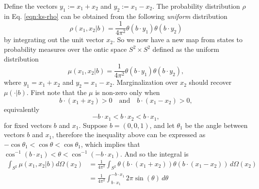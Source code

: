 \documentclass[12pt,draft]{article}
\theoremstyle{definition}
\theoremstyle{plain}
\begin{document}
    Define the vectors $y_1 := x_1 + x_2$ and $y_2 := x_1 -
    x_2$.  The probability distribution $\rho$ in Eq.
    \eqref{eqn:ks-rho} can be obtained from the following
    \textit{uniform} distribution
    \begin{equation}
        \rho(x_1, x_2 | b)
        = \frac{1}{4\pi^2} \theta(b \cdot y_1)
        \theta(b \cdot y_2)
    \end{equation}
    by integrating out the unit vector $x_2$. 
    {
        \color{blue}
        So we now have a new map from states to probability
        measures over the ontic space $S^2 \times S^2$
        defined as the uniform distribution
        \begin{equation}
            \mu(x_1, x_2 | b)
            = \frac{1}{4\pi^2}
            \theta(b \cdot y_1) \theta(b \cdot y_2),
        \end{equation}
        where $y_1 = x_1 + x_2$ and $y_2 = x_1 - x_2$.
        Marginalization over $x_2$ should recover
        $\mu(\cdot | b)$. First note that the $\mu$ is
        non-zero only when
        \begin{equation}
            b \cdot (x_1 + x_2) > 0
            \quad\text{and}\quad
            b \cdot (x_1 - x_2) > 0,
        \end{equation}
        equivalently
        \begin{equation}
            -b \cdot x_1 < b \cdot x_2 < b \cdot x_1,
        \end{equation}
        for fixed vectors $b$ and $x_1$. Suppose $b =
        (0,0,1)$, and let $\theta_1$ be the angle between
        vectors $b$ and $x_1$, therefore the inequality
        above can be expressed as $-\cos\theta_1 <
        \cos\theta < \cos\theta_1$, which implies that
        $\cos^{-1}(b \cdot x_1) < \theta <
        \cos^{-1}(-b \cdot x_1)$. And so the integral is
        \begin{align}
            \int_{S^2} \mu(x_1,x_2|b) d\Omega(x_2) 
            &= \frac{1}{4\pi^2} \int_{S^2} 
            \theta(b \cdot (x_1 + x_2)) \theta(b \cdot (x_1
            - x_2)) \, d\Omega(x_2) \\
            &= \frac{1}{4\pi^2}
            \int_{b \cdot x_1}^{-b \cdot x_1}
            2\pi \sin(\theta) \, d\theta \\

\end{align}}
\end{document}
